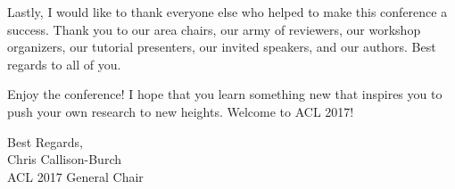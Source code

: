 Lastly, I would like to thank everyone else who helped to make this conference a success.  Thank you to our area chairs, our army of reviewers, our workshop organizers, our tutorial presenters, our invited speakers, and our authors.  Best regards to all of you.

Enjoy the conference! I hope that you learn something new that inspires you to
push your own research to new heights.  
Welcome to ACL 2017!  

\vskip 0.5in
\noindent Best Regards,\\
Chris Callison-Burch\\
ACL 2017 General Chair






